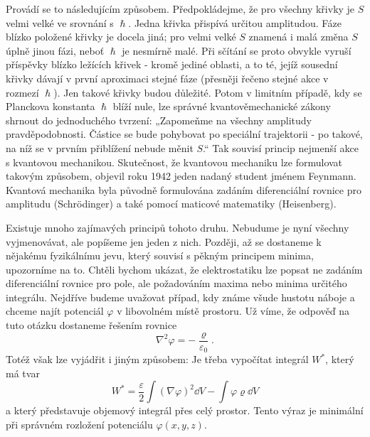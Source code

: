     Provádí se to následujícím způsobem. Předpokládejme, že pro všechny křivky je \(S\) velmi velké
    ve srovnání s \(\hslash\). Jedna křivka přispívá určitou amplitudou. Fáze blízko položené křivky
    je docela jiná; pro velmi velké \(S\) znamená i malá změna \(S\) úplně jinou fázi, neboť
    \(\hslash\) je nesmírně malé. Při sčítání se proto obvykle vyruší příspěvky blízko ležících
    křivek - kromě jediné oblasti, a to té, jejíž sousední křivky dávají v první aproximaci stejné
    fáze (přesněji řečeno stejné akce v rozmezí \(\hslash\)). Jen takové křivky budou důležité.
    Potom v limitním případě, kdy se Planckova konstanta \(\hslash\) blíží nule, lze správné
    kvantověmechanické zákony shrnout do jednoduchého tvrzení: „Zapomeňme na všechny amplitudy
    pravděpodobnosti. Částice se bude pohybovat po speciální trajektorii - po takové, na níž se v
    prvním přiblížení nebude měnit \(S\).“ Tak souvisí princip nejmenší akce s kvantovou mechanikou.
    Skutečnost, že kvantovou mechaniku lze formulovat takovým způsobem, objevil roku 1942 jeden
    nadaný student jménem Feynmann. Kvantová mechanika byla původně formulována zadáním
    diferenciální rovnice pro amplitudu (Schrödinger) a také pomocí maticové matematiky
    (Heisenberg).

    Existuje mnoho zajímavých principů tohoto druhu. Nebudume je nyní všechny vyjmenovávat, ale
    popíšeme jen jeden z nich. Později, až se dostaneme k nějakému fyzikálnímu jevu, který souvisí s
    pěkným principem minima, upozorníme na to. Chtěli bychom ukázat, že elektrostatiku lze popsat ne
    zadáním diferenciální rovnice pro pole, ale požadováním maxima nebo minima určitého integrálu.
    Nejdříve budeme uvažovat případ, kdy známe všude hustotu náboje a chceme najít potenciál
    \(\varphi\) v libovolném místě prostoru. Už víme, že odpověď na tuto otázku dostaneme řešením
    rovnice
    \begin{equation*}
      \nabla^2\varphi = -\dfrac{\varrho}{\varepsilon_0}.
    \end{equation*}
    Totéž však lze vyjádřit i jiným způsobem: Je třeba vypočítat integrál \(W^*\), který má tvar
    \begin{equation*}
      W^* = \dfrac{\varepsilon}{2}\int(\nabla\varphi)^2\dd{V} - \int\varphi\varrho\dd{V}
    \end{equation*}
    a který představuje objemový integrál přes celý prostor. Tento výraz je minimální při správném
    rozložení potenciálu \(\varphi(x, y, z)\).

